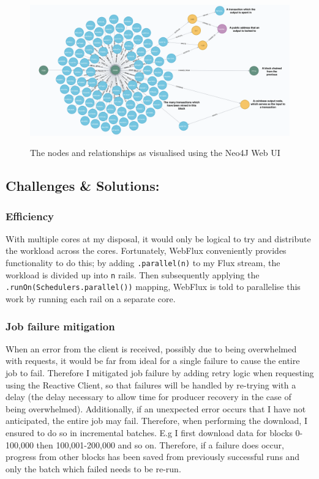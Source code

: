 \begin{figure}[h!]
  \centering
  \includegraphics[width = 15cm]{./figures/neo4j-annotated}\\[0.5cm] 
  \caption{The nodes and relationships as visualised using the Neo4J Web UI}
  \label{fig:neo4j-layout}
\end{figure}

\subsection{Challenges \& Solutions:}
\subsubsection{Efficiency}
With multiple cores at my disposal, it would only be logical to try and distribute the workload across the cores. Fortunately, WebFlux conveniently provides functionality to do this; by adding \texttt{.parallel(n)} to my Flux stream, the workload is divided up into \texttt{n} rails. Then subsequently applying the \texttt{.runOn(Schedulers.parallel())} mapping, WebFlux is told to parallelise this work by running each rail on a separate core. 
\subsubsection{Job failure mitigation}
When an error from the client is received, possibly due to being overwhelmed with requests, it would be far from ideal for a single failure to cause the entire job to fail. Therefore I mitigated job failure by adding retry logic when requesting using the Reactive Client, so that failures will be handled by re-trying with a delay (the delay necessary to allow time for producer recovery in the case of being overwhelmed). Additionally, if an unexpected error occurs that I have not anticipated, the entire job may fail. Therefore, when performing the download, I ensured to do so in incremental batches. E.g I first download data for blocks 0-100,000 then 100,001-200,000 and so on. Therefore, if a failure does occur, progress from other blocks has been saved from previously successful runs and only the batch which failed needs to be re-run. 

